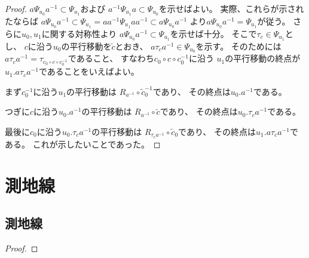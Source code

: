 \documentclass[report]{jlreq}
\begin{document}
\begin{proof}
    $a \Psi_{u_0} a^{-1} \subset \Psi_{u_1}$および
    $a^{-1} \Psi_{u_1} a \subset \Psi_{u_0}$を示せばよい。
    実際、これらが示されたならば
    $a \Psi_{u_0} a^{-1} \subset \Psi_{u_1}
    = aa^{-1} \Psi_{u_1} aa^{-1} \subset a \Psi_{u_0} a^{-1}$
    より$a \Psi_{u_0} a^{-1} = \Psi_{u_1}$が従う。
    さらに$u_0, u_1$に関する対称性より
    $a \Psi_{u_0} a^{-1} \subset \Psi_{u_1}$を示せば十分。
    そこで$\tau_c \in \Psi_{u_1}$とし、
    $c$に沿う$u_0$の平行移動を$\widetilde{c}$とおき、
    $a \tau_c a^{-1} \in \Psi_{u_0}$を示す。
    そのためには$a \tau_c a^{-1} = \tau_{c_0 \circ c \circ c_0^{-1}}$であること、
    すなわち$c_0 \circ c \circ c_0^{-1}$に沿う
    $u_1$の平行移動の終点が$u_1 . a \tau_c a^{-1}$であることをいえばよい。

    まず$c_0^{-1}$に沿う$u_1$の平行移動は
    $R_{a^{-1}} \circ \widetilde{c}_0^{-1}$であり、
    その終点は$u_0 . a^{-1}$である。

    つぎに$c$に沿う$u_0 . a^{-1}$の平行移動は
    $R_{a^{-1}} \circ \widetilde{c}$であり、
    その終点は$u_0 . \tau_c a^{-1}$である。

    最後に$c_0$に沿う$u_0 . \tau_c a^{-1}$の平行移動は
    $R_{\tau_c a^{-1}} \circ \widetilde{c}_0$であり、
    その終点は$u_1 . a \tau_c a^{-1}$である。
    これが示したいことであった。
\end{proof}

%
\newpage
\appendix

%
\chapter{測地線}

%
\section{測地線}

\begin{theorem}[初期値問題の解の一意性]
    \TODO{}
\end{theorem}

\begin{proof}
    \TODO{}
\end{proof}
\end{document}
